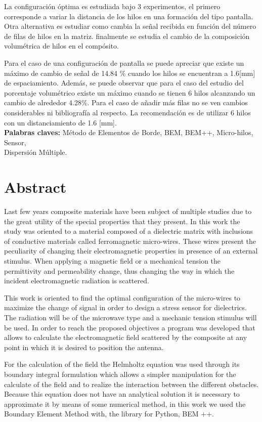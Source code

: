 \documentclass[12pt,letterpaper]{article}
\numberwithin{equation}{section}
\begin{document}
La configuración óptima es estudiada bajo 3 experimentos, el primero corresponde a variar la distancia de los hilos en una formación del tipo pantalla. Otra alternativa es estudiar como cambia la señal recibida en función del número de filas de hilos en la matriz. finalmente se estudia el cambio de la composición volumétrica de hilos en el compósito.

Para el caso de una configuración de pantalla se puede apreciar que existe un máximo de cambio de señal de 14.84 \% cuando los hilos se encuentran a 1.6[mm] de espaciamiento. Además, se puede observar que para el caso del estudio del porcentaje volumétrico existe un máximo cuando se tienen 6 hilos alcanzando un cambio de alrededor 4.28\%. Para el caso de añadir más filas no se ven cambios considerables ni bibliografía al respecto. La recomendación es de utilizar 6 hilos con un distanciamiento de 1.6 [mm].\\

\noindent\textbf{Palabras claves:} Método de Elementos de Borde, BEM, BEM++, Micro-hilos, Sensor,\\ Dispersión Múltiple.
\pagebreak
\section*{Abstract}
Last few years composite materials have been subject of multiple studies due to the great utility of the special properties that they present. In this work the study was oriented to a material composed of a dielectric matrix with inclusions of conductive materials called ferromagnetic micro-wires. These wires present the peculiarity of changing their electromagnetic properties in presence of an external stimulus. When applying a magnetic field or a mechanical tension the permittivity and permeability change, thus changing the way in which the incident electromagnetic radiation is scattered.

This work is oriented to find the optimal configuration of the micro-wires to maximize the change of signal in order to design a stress sensor for dielectrics. The radiation will be of the microwave type and a mechanic tension stimulus will be used. In order to reach the proposed objectives a program was developed that allows to calculate the electromagnetic field scattered by the composite at any point in which it is desired to position the antenna.

For the calculation of the field the Helmholtz equation was used through its boundary integral formulation which allows a simpler manipulation for the calculate of the field and to realize the interaction between the different obstacles. Because this equation does not have an analytical solution it is necessary to approximate it by means of some numerical method, in this work we used the Boundary Element Method with, the library for Python, BEM ++.
\end{document}
